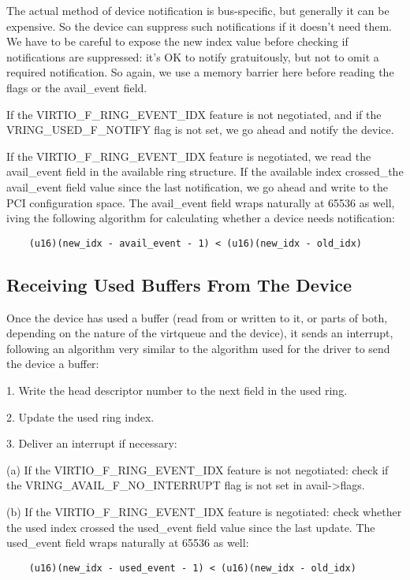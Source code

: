 The actual method of device notification is bus-specific, but generally
it can be expensive.  So the device can suppress such notifications if it
doesn't need them.  We have to be careful to expose the new index
value before checking if notifications are suppressed: it's OK to notify
gratuitously, but not to omit a required notification. So again,
we use a memory barrier here before reading the flags or the
avail_event field.

If the VIRTIO_F_RING_EVENT_IDX feature is not negotiated, and if the
VRING_USED_F_NOTIFY flag is not set, we go ahead and notify the
device.

If the VIRTIO_F_RING_EVENT_IDX feature is negotiated, we read the
avail_event field in the available ring structure. If the
available index crossed_the avail_event field value since the
last notification, we go ahead and write to the PCI configuration
space.  The avail_event field wraps naturally at 65536 as well,
iving the following algorithm for calculating whether a device needs
notification:

\begin{lstlisting}
	(u16)(new_idx - avail_event - 1) < (u16)(new_idx - old_idx)
\end{lstlisting}

\subsection{Receiving Used Buffers From The Device}\label{sec:General Initialization And Device Operation / Device Operation / Receiving Used Buffers From The Device}

Once the device has used a buffer (read from or written to it, or
parts of both, depending on the nature of the virtqueue and the
device), it sends an interrupt, following an algorithm very
similar to the algorithm used for the driver to send the device a
buffer:

1. Write the head descriptor number to the next field in the used
  ring.

2. Update the used ring index.

3. Deliver an interrupt if necessary:

  (a) If the VIRTIO_F_RING_EVENT_IDX feature is not negotiated:
    check if the VRING_AVAIL_F_NO_INTERRUPT flag is not set in
    avail->flags.

  (b) If the VIRTIO_F_RING_EVENT_IDX feature is negotiated: check
    whether the used index crossed the used_event field value
    since the last update. The used_event field wraps naturally
    at 65536 as well:
\begin{lstlisting}
	(u16)(new_idx - used_event - 1) < (u16)(new_idx - old_idx)
\end{lstlisting}

